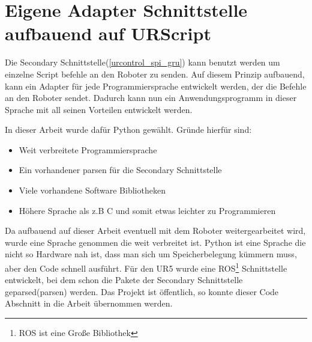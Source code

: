 \section{Eigene Adapter Schnittstelle aufbauend auf URScript}
\label{sec:urscript_adapter}

Die Secondary Schnittstelle(\ref{urcontrol_spi_gru}) kann benutzt werden um einzelne Script befehle an den Roboter zu senden. Auf diesem Prinzip aufbauend, kann ein Adapter für jede Programmiersprache entwickelt werden, der die Befehle an den Roboter sendet. Dadurch kann nun ein Anwendungsprogramm in dieser Sprache mit all seinen Vorteilen entwickelt werden.

In dieser Arbeit wurde dafür Python gewählt. Gründe hierfür sind:

\begin{itemize}
\item Weit verbreitete Programmiersprache
\item Ein vorhandener \acl{parsen} für die Secondary Schnittstelle
\item Viele vorhandene Software Bibliotheken
\item Höhere Sprache als z.B C und somit etwas leichter zu Programmieren
\end{itemize}

Da aufbauend auf dieser Arbeit eventuell mit dem Roboter weitergearbeitet wird, wurde eine Sprache genommen die weit verbreitet ist. Python ist eine Sprache die nicht so Hardware nah ist, dass man sich um Speicherbelegung kümmern muss, aber den Code schnell ausführt.
Für den UR5 wurde eine \ac{ROS}\footnote{ROS ist eine Große Bibliothek} Schnittstelle entwickelt, bei dem schon die Pakete der Secondary Schnittstelle geparsed(\acl{parsen}) werden. Das Projekt ist öffentlich, so konnte dieser Code Abschnitt in die Arbeit übernommen werden.